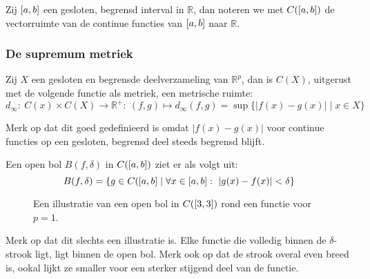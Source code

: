 \documentclass[main.tex]{subfiles}
\begin{document}
\begin{de}
  Zij $\interval{a}{b}$ een gesloten, begrensd interval in $\mathbb{R}$, dan noteren we met $C(\interval{a}{b})$ de vectorruimte van de continue functies van $\interval{a}{b}$ naar $\mathbb{R}$.
\end{de}

\subsubsection{De supremum metriek}
\label{sec:supremum-metriek}

\begin{vb}
  Zij $X$ een gesloten en begrensde deelverzameling van $\mathbb{R}^{p}$, dan is $C(X)$, uitgerust met de volgende functie als metriek, een metrische ruimte:
  \[ d_{\infty}:\ C(x)\times C(X)\rightarrow \mathbb{R}^{+}:\ (f,g) \mapsto d_{\infty}(f,g) = \sup \{ |f(x)-g(x)| \mid x \in X \} \]

\end{vb}

\begin{opm}
  Merk op dat dit goed gedefinieerd is omdat $|f(x)-g(x)|$ voor continue functies op een gesloten, begrensd deel steeds begrensd blijft. \needed
\end{opm}

\begin{vb}
  Een open bol $B(f,\delta)$ in $C(\interval{a}{b})$ ziet er als volgt uit:
  \[ B(f,\delta) = \{ g \in C(\interval{a}{b} \mid  \forall x\in \interval{a}{b}:\ |g(x)-f(x)|< \delta \} \]
  \begin{figure}[H]
    \centering
    \caption{ Een illustratie van een open bol in $C(\interval{3}{3})$ rond een functie voor $p=1$. }
  \end{figure}

  \noindent
  Merk op dat dit slechts een illustratie is.
  Elke functie die volledig binnen de $\delta$-strook ligt, ligt binnen de open bol.
  Merk ook op dat de strook overal even breed is, ookal lijkt ze smaller voor een sterker stijgend deel van de functie.
\end{vb}
\end{document}
